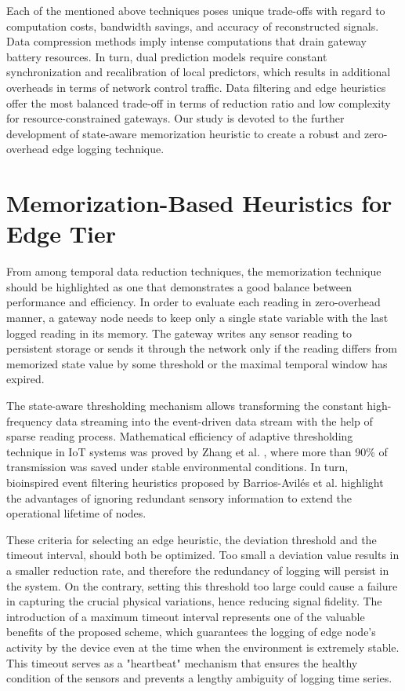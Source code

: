 Each of the mentioned above techniques poses unique trade-offs with regard to computation costs, bandwidth savings, and accuracy of reconstructed signals. Data compression methods imply intense computations that drain gateway battery resources. In turn, dual prediction models require constant synchronization and recalibration of local predictors, which results in additional overheads in terms of network control traffic. Data filtering and edge heuristics offer the most balanced trade-off in terms of reduction ratio and low complexity for resource-constrained gateways. Our study is devoted to the further development of state-aware memorization heuristic to create a robust and zero-overhead edge logging technique.

\section{Memorization-Based Heuristics for Edge Tier}
From among temporal data reduction techniques, the memorization technique should be highlighted as one that demonstrates a good balance between performance and efficiency. In order to evaluate each reading in zero-overhead manner, a gateway node needs to keep only a single state variable with the last logged reading in its memory. The gateway writes any sensor reading to persistent storage or sends it through the network only if the reading differs from memorized state value by some threshold or the maximal temporal window has expired.

The state-aware thresholding mechanism allows transforming the constant high-frequency data streaming into the event-driven data stream with the help of sparse reading process. Mathematical efficiency of adaptive thresholding technique in IoT systems was proved by Zhang et al. \cite{ref15, ref35, ref55}, where more than 90\% of transmission was saved under stable environmental conditions. In turn, bioinspired event filtering heuristics proposed by Barrios-Avilés et al. \cite{ref16, ref36, ref56} highlight the advantages of ignoring redundant sensory information to extend the operational lifetime of nodes.

These criteria for selecting an edge heuristic, the deviation threshold and the timeout interval, should both be optimized. Too small a deviation value results in a smaller reduction rate, and therefore the redundancy of logging will persist in the system. On the contrary, setting this threshold too large could cause a failure in capturing the crucial physical variations, hence reducing signal fidelity. The introduction of a maximum timeout interval represents one of the valuable benefits of the proposed scheme, which guarantees the logging of edge node's activity by the device even at the time when the environment is extremely stable. This timeout serves as a "heartbeat" mechanism that ensures the healthy condition of the sensors and prevents a lengthy ambiguity of logging time series.

